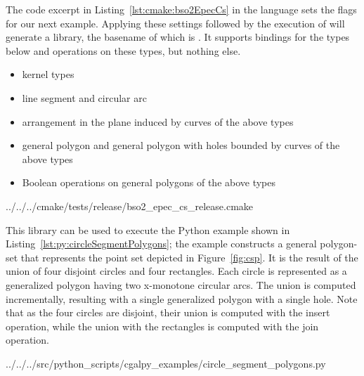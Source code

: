 The code excerpt in Listing~\ref{lst:cmake:bso2EpecCs} in the \cmake{} language sets the \cmake{} flags for our next example. Applying these settings followed by the execution of  will generate a library, the basename of which is . It supports bindings for the types below and operations on these types, but nothing else.
\begin{itemize}
\item kernel types
\item line segment and circular arc
\item arrangement in the plane induced by curves of the above types
\item general polygon and general polygon with holes bounded by curves of the above types
\item Boolean operations on general polygons of the above types
\end{itemize}

\begin{lstfloat}
%
                 {../../../cmake/tests/release/bso2_epec_cs_release.cmake}
\end{lstfloat}

This library can be used to execute the Python example shown in Listing~\ref{lst:py:circleSegmentPolygons}; the example constructs a general polygon-set that represents the point set depicted in Figure~\ref{fig:csp}. It is the result of the union of four disjoint circles and four rectangles. Each circle is represented as a generalized polygon having two x-monotone circular arcs. The union is computed incrementally, resulting with a single generalized polygon with a single hole. Note that as the four circles are disjoint, their union is computed with the insert operation, while the union with the rectangles is computed with the join operation.

\begin{lstfloat}
%
                 {../../../src/python_scripts/cgalpy_examples/circle_segment_polygons.py}
\end{lstfloat}

